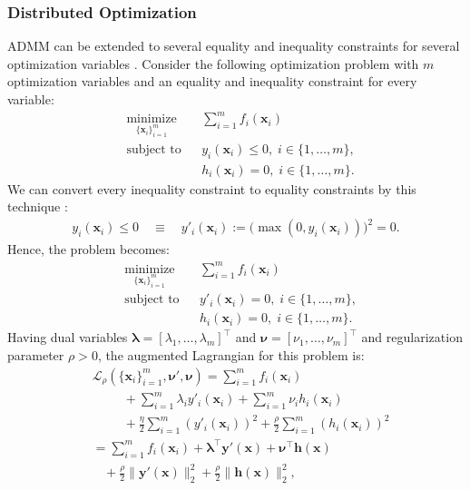 \documentclass[lang=cn,10pt]{gorgeousnbook}
\numberwithin{equation}{section}%
\numberwithin{figure}{section}%
\begin{document}
\subsubsection{Distributed Optimization}

ADMM can be extended to several equality and inequality constraints for several optimization variables \cite{giesen2016distributed,giesen2019combining}. 
Consider the following optimization problem with $m$ optimization variables and an equality and inequality constraint for every variable:
\begin{equation}\label{equation_ADMM_optimization_problem_general}
\begin{aligned}
& \underset{\{\boldsymbol{x}_i\}_{i=1}^m}{\text{minimize}}
& & \sum_{i=1}^m f_i(\boldsymbol{x}_i) \\
& \text{subject to}
& & y_i(\boldsymbol{x}_i) \leq 0, \; i \in \{1, \ldots, m\}, \\
& & & h_i(\boldsymbol{x}_i) = 0, \; i \in \{1, \ldots, m\}.
\end{aligned}
\end{equation}
We can convert every inequality constraint to equality constraints by this technique \cite{giesen2016distributed,giesen2019combining}:
\begin{align*}
y_i(\boldsymbol{x}_i) \leq 0 \quad \equiv \quad y'_i(\boldsymbol{x}_i) := \big(\!\max(0, y_i(\boldsymbol{x}_i))\big)^2 = 0.
\end{align*}
Hence, the problem becomes:
\begin{equation*}
\begin{aligned}
& \underset{\{\boldsymbol{x}_i\}_{i=1}^m}{\text{minimize}}
& & \sum_{i=1}^m f_i(\boldsymbol{x}_i) \\
& \text{subject to}
& & y'_i(\boldsymbol{x}_i) = 0, \; i \in \{1, \ldots, m\}, \\
& & & h_i(\boldsymbol{x}_i) = 0, \; i \in \{1, \ldots, m\}.
\end{aligned}
\end{equation*}
Having dual variables $\boldsymbol{\lambda} = [\lambda_1, \dots, \lambda_m]^\top$ and $\boldsymbol{\nu} = [\nu_1, \dots, \nu_m]^\top$ and regularization parameter $\rho>0$, the augmented Lagrangian for this problem is:
\begin{equation}\label{equation_ADMM_augmented_Lagrangian_general}
\begin{aligned}
&\mathcal{L}_\rho(\{\boldsymbol{x}_i\}_{i=1}^m, \boldsymbol{\nu}', \boldsymbol{\nu}) = \sum_{i=1}^m f_i(\boldsymbol{x}_i) \\
&~~~~~~~~~~~+ \sum_{i=1}^{m} \lambda_i y'_i(\boldsymbol{x}_i) + \sum_{i=1}^{m} \nu_i h_i(\boldsymbol{x}_i) \\
&~~~~~~~~~~~+ \frac{\eta}{2} \sum_{i=1}^{m} (y'_i(\boldsymbol{x}_i))^2 + \frac{\rho}{2} \sum_{i=1}^{m} (h_i(\boldsymbol{x}_i))^2  \\
&= \sum_{i=1}^m f_i(\boldsymbol{x}_i) + \boldsymbol{\lambda}^\top \boldsymbol{y}'(\boldsymbol{x}) + \boldsymbol{\nu}^\top \boldsymbol{h}(\boldsymbol{x}) \\
&~~~~+ \frac{\rho}{2} \|\boldsymbol{y}'(\boldsymbol{x})\|_2^2 + \frac{\rho}{2} \|\boldsymbol{h}(\boldsymbol{x})\|_2^2, 
\end{aligned}
\end{equation}
\end{document}
